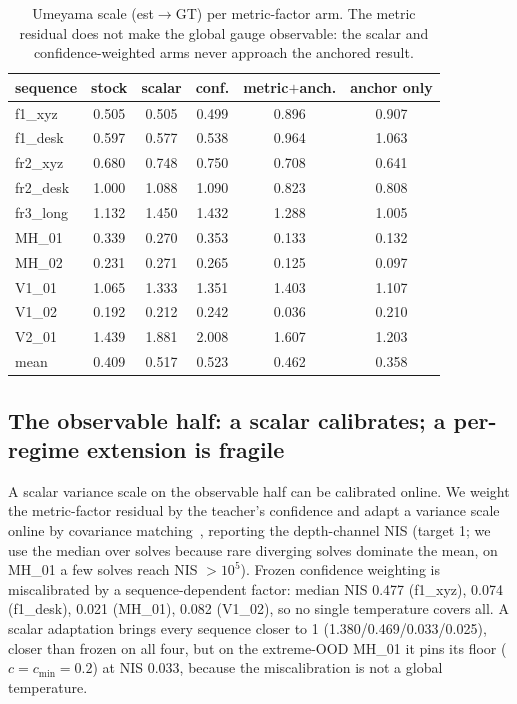 \begin{table}[t]
\centering
\caption{Umeyama scale (est$\to$GT) per metric-factor arm. The metric residual
does not make the global gauge observable: the scalar and confidence-weighted
arms never approach the anchored result.}
\label{tab:arms}
\scriptsize
\setlength{\tabcolsep}{4pt}
\begin{tabular}{@{}lccccc@{}}
\toprule
sequence & stock & scalar & conf. & metric$+$anch. & anchor only \\
\midrule
f1\_xyz & 0.505 & 0.505 & 0.499 & 0.896 & 0.907 \\
f1\_desk & 0.597 & 0.577 & 0.538 & 0.964 & 1.063 \\
fr2\_xyz & 0.680 & 0.748 & 0.750 & 0.708 & 0.641 \\
fr2\_desk & 1.000 & 1.088 & 1.090 & 0.823 & 0.808 \\
fr3\_long & 1.132 & 1.450 & 1.432 & 1.288 & 1.005 \\
MH\_01 & 0.339 & 0.270 & 0.353 & 0.133 & 0.132 \\
MH\_02 & 0.231 & 0.271 & 0.265 & 0.125 & 0.097 \\
V1\_01 & 1.065 & 1.333 & 1.351 & 1.403 & 1.107 \\
V1\_02 & 0.192 & 0.212 & 0.242 & 0.036 & 0.210 \\
V2\_01 & 1.439 & 1.881 & 2.008 & 1.607 & 1.203 \\
\midrule
mean & 0.409 & 0.517 & 0.523 & 0.462 & 0.358 \\
\bottomrule
\end{tabular}
\end{table}

\subsection{The observable half: a scalar calibrates; a per-regime extension is fragile}
\label{sec:observable}

A scalar variance scale on the observable half can be calibrated online. We
weight the metric-factor residual by the teacher's confidence and adapt a
variance scale online by covariance matching~\cite{mehra}, reporting the depth-channel NIS
(target 1; we use the median over solves because rare diverging solves dominate
the mean, on MH\_01 a few solves reach NIS $>10^5$). Frozen confidence weighting
is miscalibrated by a sequence-dependent factor: median NIS 0.477 (f1\_xyz),
0.074 (f1\_desk), 0.021 (MH\_01), 0.082 (V1\_02), so no single temperature
covers all. A scalar adaptation brings every sequence closer to 1
(1.380/0.469/0.033/0.025), closer than frozen on all four, but on the
extreme-OOD MH\_01 it pins its floor ($c=c_{\min}=0.2$) at NIS 0.033, because
the miscalibration is not a global temperature.

